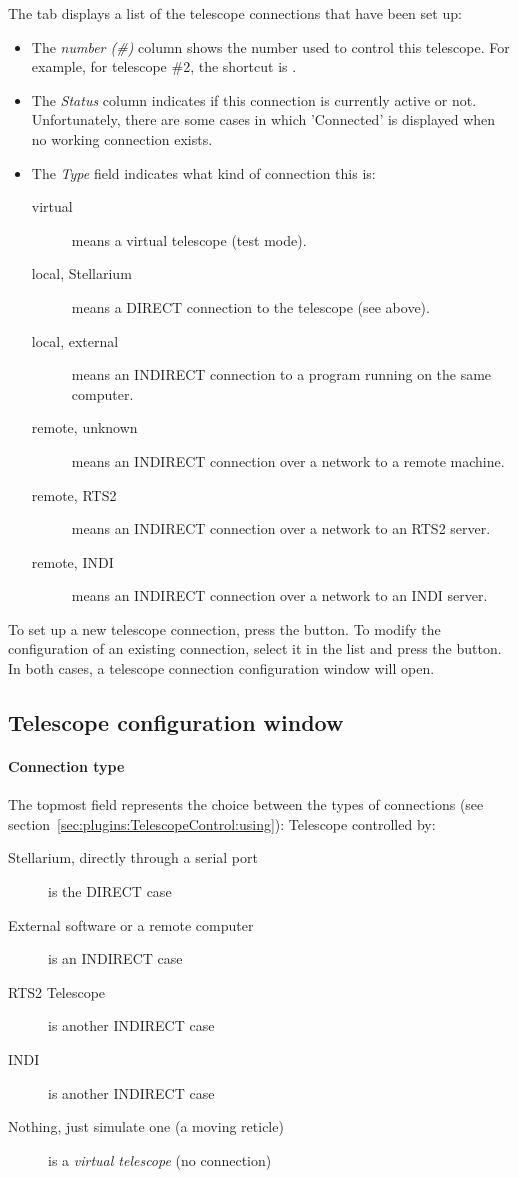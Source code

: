 \noindent The  tab displays a list of the telescope connections that have been set up:

\begin{itemize}
\item The \emph{number (\#)} column shows the number used to control this
  telescope. For example, for telescope \#2, the shortcut is
  .
\item The \emph{Status} column indicates if this connection is
  currently active or not. Unfortunately, there are some cases in
  which 'Connected' is displayed when no working connection exists.
\item The \emph{Type} field indicates what kind of connection this is:
  \begin{description}
  \item[virtual] means a virtual telescope (test mode).
  \item[local, Stellarium] means a DIRECT connection to the telescope (see above).
  \item[local, external] means an INDIRECT connection to a program running on the same computer.
  \item[remote, unknown] means an INDIRECT connection over a network to a remote machine.
  \item[remote, RTS2] means an INDIRECT connection over a network to an RTS2 server.
  \item[remote, INDI] means an INDIRECT connection over a network to an INDI server.
  \end{description}
\end{itemize}

\noindent To set up a new telescope connection, press the  button. To modify
the configuration of an existing connection, select it in the list and
press the  button. In both cases, a telescope connection
configuration window will open.



\subsection{Telescope configuration window}

\paragraph{Connection type}
The topmost field represents the choice between the types of connections (see section~\ref{sec:plugins:TelescopeControl:using}):
Telescope controlled by:
\begin{description}
\item[Stellarium, directly through a serial port] is the DIRECT case
\item[External software or a remote computer] is an INDIRECT case
\item[RTS2 Telescope] is another INDIRECT case
\item[INDI] is another INDIRECT case
\item[Nothing, just simulate one (a moving reticle)] is a \emph{virtual telescope} (no connection)
\end{description}

